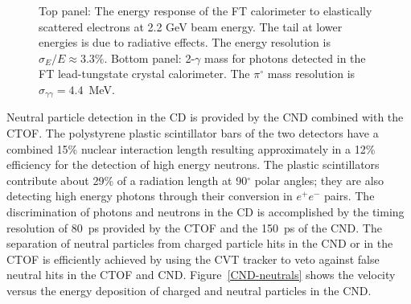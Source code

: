 \documentclass[final,3p,twocolumn]{elsarticle}
\begin{document}
\begin{figure}[htbp!]
\caption{Top panel: The energy response of the FT calorimeter to elastically scattered electrons at 2.2 GeV beam energy. 
The tail at lower energies is due to radiative effects. The energy resolution is $\sigma_E / E \approx 3.3\%$. 
Bottom panel: 2-$\gamma$ mass for photons detected in the FT lead-tungstate crystal calorimeter. The $\pi^\circ$ 
mass resolution is $\sigma_{\gamma\gamma} = 4.4$~MeV. }

\label{gg}
\end{figure}




Neutral particle detection in the CD is provided by the CND combined with the CTOF. The polystyrene plastic
scintillator bars of the two detectors have a combined 15\% nuclear interaction length resulting approximately in
a 12\% efficiency for the detection of high energy neutrons. The plastic scintillators contribute about 29\% of a
radiation length at 90$^\circ$ polar angles; they are also detecting high energy photons through their conversion
in $e^+e^-$ pairs. The discrimination of photons and neutrons in the CD is  accomplished by the timing resolution of
80~ps provided by the CTOF and the 150~ps of the CND. The separation of neutral particles from charged
particle hits in the CND or in the CTOF is efficiently achieved by using the CVT tracker to veto against false neutral
hits in the CTOF and CND. Figure~\ref{CND-neutrals} shows the velocity versus the energy deposition of charged
and neutral particles in the CND.  
\end{document}
